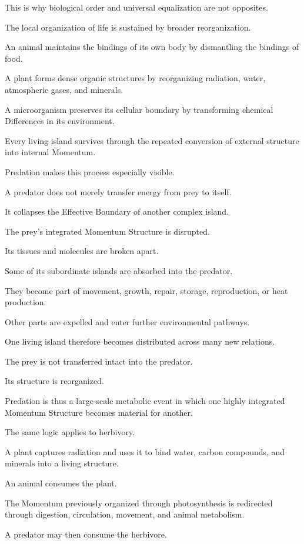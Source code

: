 This is why biological order and universal equalization are not opposites.

The local organization of life is sustained by broader reorganization.

An animal maintains the bindings of its own body by dismantling the bindings of food.

A plant forms dense organic structures by reorganizing radiation, water, atmospheric gases, and minerals.

A microorganism preserves its cellular boundary by transforming chemical Differences in its environment.

Every living island survives through the repeated conversion of external structure into internal Momentum.

Predation makes this process especially visible.

A predator does not merely transfer energy from prey to itself.

It collapses the Effective Boundary of another complex island.

The prey’s integrated Momentum Structure is disrupted.

Its tissues and molecules are broken apart.

Some of its subordinate islands are absorbed into the predator.

They become part of movement, growth, repair, storage, reproduction, or heat production.

Other parts are expelled and enter further environmental pathways.

One living island therefore becomes distributed across many new relations.

The prey is not transferred intact into the predator.

Its structure is reorganized.

Predation is thus a large-scale metabolic event in which one highly integrated Momentum Structure becomes material for another.

The same logic applies to herbivory.

A plant captures radiation and uses it to bind water, carbon compounds, and minerals into a living structure.

An animal consumes the plant.

The Momentum previously organized through photosynthesis is redirected through digestion, circulation, movement, and animal metabolism.

A predator may then consume the herbivore.

